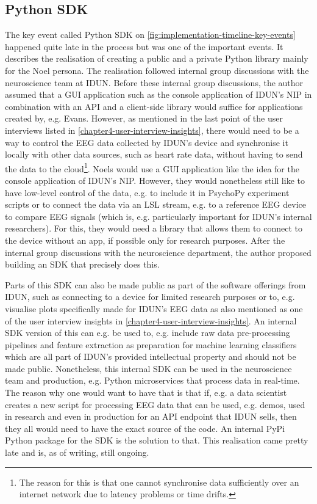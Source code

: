 \subsection{Python SDK}
\label{chapter4-python-sdk}

The key event called Python SDK on \autoref{fig:implementation-timeline-key-events} happened quite late in the process but was one of the important events. It describes the realisation of creating a public and a private Python library mainly for the Noel persona. The realisation followed internal group discussions with the neuroscience team at IDUN. Before these internal group discussions, the author assumed that a GUI application such as the console application of IDUN's NIP in combination with an API and a client-side library would suffice for applications created by, e.g. Evans. However, as mentioned in the last point of the user interviews listed in \autoref{chapter4-user-interview-insights}, there would need to be a way to control the EEG data collected by IDUN's device and synchronise it locally with other data sources, such as heart rate data, without having to send the data to the cloud\footnote{The reason for this is that one cannot synchronise data sufficiently over an internet network due to latency problems or time drifts.}. Noels would use a GUI application like the idea for the console application of IDUN's NIP. However, they would nonetheless still like to have low-level control of the data, e.g. to include it in PsychoPy experiment scripts or to connect the data via an LSL stream, e.g. to a reference EEG device to compare EEG signals (which is, e.g. particularly important for IDUN's internal researchers). For this, they would need a library that allows them to connect to the device without an app, if possible only for research purposes. After the internal group discussions with the neuroscience department, the author proposed building an SDK that precisely does this.

Parts of this SDK can also be made public as part of the software offerings from IDUN, such as connecting to a device for limited research purposes or to, e.g. visualise plots specifically made for IDUN's EEG data as also mentioned as one of the user interview insights in \autoref{chapter4-user-interview-insights}. An internal SDK version of this can e.g. be used to, e.g. include raw data pre-processing pipelines and feature extraction as preparation for machine learning classifiers which are all part of IDUN's provided intellectual property and should not be made public. Nonetheless, this internal SDK can be used in the neuroscience team and production, e.g. Python microservices that process data in real-time. The reason why one would want to have that is that if, e.g. a data scientist creates a new script for processing EEG data that can be used, e.g. demos, used in research and even in production for an API endpoint that IDUN sells, then they all would need to have the exact source of the code. An internal PyPi Python package for the SDK is the solution to that. This realisation came pretty late and is, as of writing, still ongoing.

